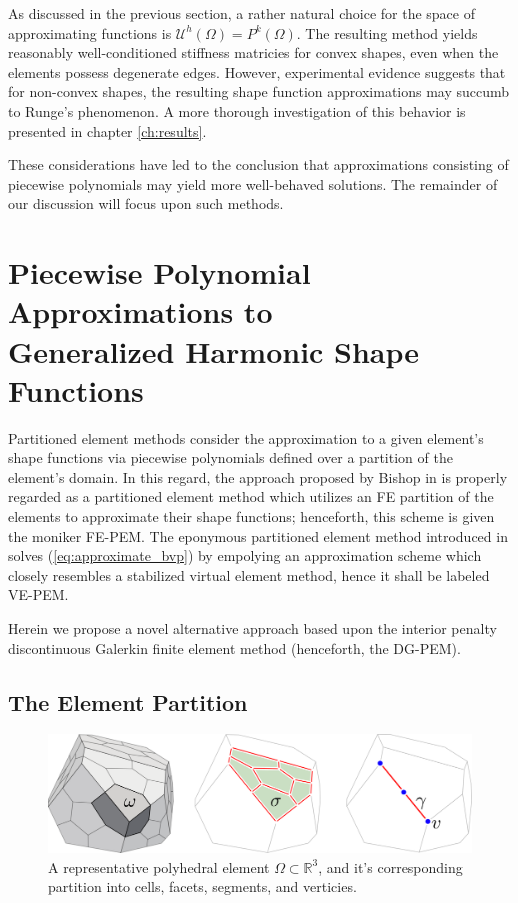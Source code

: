 	As discussed in the previous section, a rather natural choice for the space of approximating functions is $\mathcal{U}^h (\Omega) = P^{k} (\Omega)$. The resulting method yields reasonably well-conditioned stiffness matricies for convex shapes, even when the elements possess degenerate edges. However, experimental evidence suggests that for non-convex shapes, the resulting shape function approximations may succumb to Runge's phenomenon. A more thorough investigation of this behavior is presented in chapter \ref{ch:results}.
	
	These considerations have led to the conclusion that approximations consisting of piecewise polynomials may yield more well-behaved solutions. The remainder of our discussion will focus upon such methods.
	
\section{Piecewise Polynomial Approximations to \\ Generalized Harmonic Shape Functions}

Partitioned element methods consider the approximation to a given element's shape functions via piecewise polynomials defined over a partition of the element's domain. In this regard, the approach proposed by Bishop in \cite{Bishop:14} is properly regarded as a partitioned element method which utilizes an FE partition of the elements to approximate their shape functions; henceforth, this scheme is given the moniker FE-PEM. The eponymous partitioned element method introduced in \cite{Rashid:12} solves (\ref{eq:approximate_bvp}) by empolying an approximation scheme which closely resembles a stabilized virtual element method, hence it shall be labeled VE-PEM.

Herein we propose a novel alternative approach based upon the interior penalty discontinuous Galerkin finite element method (henceforth, the DG-PEM).

\subsection*{The Element Partition}

\begin{figure} [!ht]
	\centering
	\includegraphics[width = 6.0in]{figures/polyhedron_partition.pdf}
	\caption{A representative polyhedral element $\Omega \subset \mathbb{R}^3$, and it's corresponding partition into cells, facets, segments, and verticies.}
	\label{fig:partitioned_element}
\end{figure}

